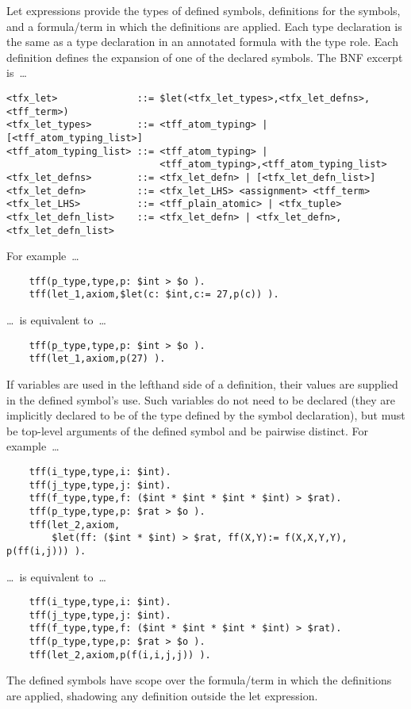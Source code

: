 \documentclass{easychair}
\begin{document}
Let expressions provide the types of defined symbols, definitions for the 
symbols, and a formula/term in which the definitions are applied. 
Each type declaration is the same as a type declaration in an annotated 
formula with the type role.
Each definition defines the expansion of one of the declared symbols.
The BNF excerpt is~\ldots
\begin{verbatim}
<tfx_let>              ::= $let(<tfx_let_types>,<tfx_let_defns>,<tff_term>)
<tfx_let_types>        ::= <tff_atom_typing> | [<tff_atom_typing_list>]
<tff_atom_typing_list> ::= <tff_atom_typing> |
                           <tff_atom_typing>,<tff_atom_typing_list>
<tfx_let_defns>        ::= <tfx_let_defn> | [<tfx_let_defn_list>]
<tfx_let_defn>         ::= <tfx_let_LHS> <assignment> <tff_term>
<tfx_let_LHS>          ::= <tff_plain_atomic> | <tfx_tuple>
<tfx_let_defn_list>    ::= <tfx_let_defn> | <tfx_let_defn>,<tfx_let_defn_list>
\end{verbatim}
For example~\ldots
\begin{verbatim}
    tff(p_type,type,p: $int > $o ).
    tff(let_1,axiom,$let(c: $int,c:= 27,p(c)) ).
\end{verbatim}
\ldots~is equivalent to~\ldots
\begin{verbatim}
    tff(p_type,type,p: $int > $o ).
    tff(let_1,axiom,p(27) ).
\end{verbatim}
If variables are used in the lefthand side of a definition, their values are 
supplied in the defined symbol's use. 
Such variables do not need to be declared (they are implicitly declared to be 
of the type defined by the symbol declaration), but must be top-level arguments 
of the defined symbol and be pairwise distinct. 
For example~\ldots
\begin{verbatim}
    tff(i_type,type,i: $int).
    tff(j_type,type,j: $int).
    tff(f_type,type,f: ($int * $int * $int * $int) > $rat).
    tff(p_type,type,p: $rat > $o ).
    tff(let_2,axiom,
        $let(ff: ($int * $int) > $rat, ff(X,Y):= f(X,X,Y,Y), p(ff(i,j))) ).
\end{verbatim}
\ldots~is equivalent to~\ldots
\begin{verbatim}
    tff(i_type,type,i: $int).
    tff(j_type,type,j: $int).
    tff(f_type,type,f: ($int * $int * $int * $int) > $rat).
    tff(p_type,type,p: $rat > $o ).
    tff(let_2,axiom,p(f(i,i,j,j)) ).
\end{verbatim}
The defined symbols have scope over the formula/term in which the definitions 
are applied, shadowing any definition outside the let expression. 
\end{document}
